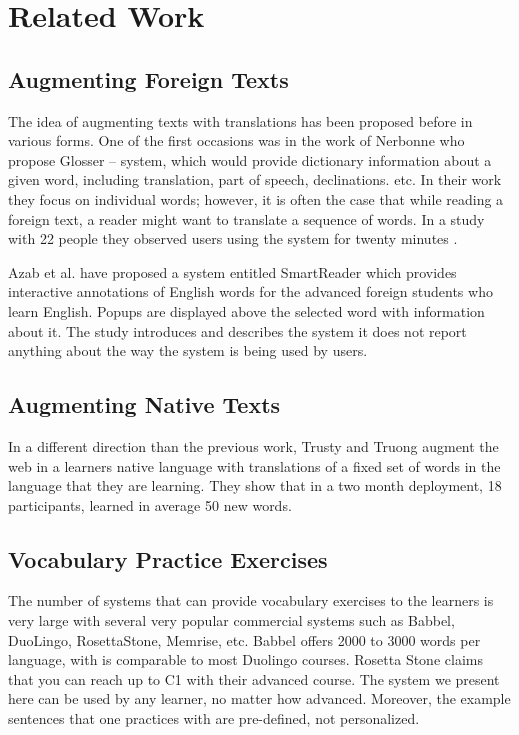 
\section{Related Work}


\subsection{Augmenting Foreign Texts}
The idea of augmenting texts with translations has been proposed before in various forms. One of the first occasions was in the work of Nerbonne \cite{Nerb99-Assistant} who propose Glosser -- system, which would provide dictionary information about a given word, including translation, part of speech, declinations. etc. In their work they focus on individual words; however, it is often the case that while reading a foreign text, a reader might want to translate a sequence of words. In a study with 22 people they observed users using the system for twenty minutes \cite{Dokter98-UserStudy}.

Azab et al. \cite{Azab13-nlp} have proposed a system entitled SmartReader which provides interactive annotations of English words for the advanced foreign students who learn English. Popups are displayed above the selected word with information about it. The study introduces and describes the system it does not report anything about the way the system is being used by users.

\subsection{Augmenting Native Texts}
In a different direction than the previous work, Trusty and Truong augment the web in a learners native language with translations of a fixed set of words in the language that they are learning\cite{Trus11web}. They show that in a two month deployment, 18 participants, learned in average 50 new words.

\subsection{Vocabulary Practice Exercises}
The number of systems that can provide vocabulary exercises to the learners is very large with several very popular commercial systems such as Babbel, DuoLingo, RosettaStone, Memrise, etc. Babbel offers 2000 to 3000 words per language, with is comparable to most Duolingo courses. Rosetta Stone claims that you can reach up to C1 with their advanced course. The system we present here can be used by any learner, no matter how advanced. Moreover, the example sentences that one practices with are pre-defined, not personalized.

